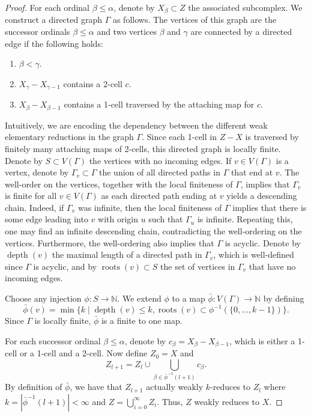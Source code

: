 \documentclass{amsart}
\theoremstyle{definition}
\DeclareMathOperator{\depth}{depth}
\DeclareMathOperator{\roots}{roots}
\newcommand{\N}{\mathbb{N}}
\begin{document}
\begin{proof}
    For each ordinal $\beta\leqslant \alpha$, denote by $X_{\beta}\subset Z$ the associated subcomplex. We construct a directed graph $\Gamma$ as follows. The vertices of this graph are the successor ordinals $\beta\leqslant \alpha$ and two vertices $\beta$ and $\gamma$ are connected by a directed edge if the following holds:
    \begin{enumerate}
        \item $\beta<\gamma$.
        \item $X_{\gamma} - X_{\gamma -1}$ contains a 2-cell $c$.
        \item $X_{\beta} - X_{\beta-1}$ contains a 1-cell traversed by the attaching map for $c$.
    \end{enumerate} 
Intuitively, we are encoding the dependency between the different weak elementary reductions in the graph $\Gamma$. Since each 1-cell in $Z - X$ is traversed by finitely many attaching maps of 2-cells, this directed graph is locally finite. Denote by $S\subset V(\Gamma)$ the vertices with no incoming edges. If $v\in V(\Gamma)$ is a vertex, denote by $\Gamma_v\subset \Gamma$ the union of all directed paths in $\Gamma$ that end at $v$. The well-order on the vertices, together with the local finiteness of $\Gamma$, implies that $\Gamma_v$ is finite for all $v\in V(\Gamma)$ as each directed path ending at $v$ yields a descending chain. Indeed, if $\Gamma_v$ was infinite, then the local finiteness of $\Gamma$ implies that there is some edge leading into $v$ with origin $u$ such that $\Gamma_u$ is infinite. Repeating this, one may find an infinite descending chain, contradicting the well-ordering on the vertices. Furthermore, the well-ordering also implies that $\Gamma$ is acyclic. Denote by $\depth(v)$ the maximal length of a directed path in $\Gamma_v$, which is well-defined since $\Gamma$ is acyclic, and by $\roots(v)\subset S$ the set of vertices in $\Gamma_v$ that have no incoming edges.

    Choose any injection $\phi\colon S\to \N$. We extend $\phi$ to a map $\bar{\phi}\colon V(\Gamma)\to \N$ by defining 
    \[
    \bar{\phi}(v) = \min{\{k \mid \depth(v)\leqslant k, \roots(v)\subset \phi^{-1}(\{0, \ldots, k-1\})\}}.
    \]
    Since $\Gamma$ is locally finite, $\bar{\phi}$ is a finite to one map.

    For each successor ordinal $\beta\leqslant \alpha$, denote by $c_{\beta} = X_{\beta} - X_{\beta-1}$, which is either a 1-cell or a 1-cell and a 2-cell. Now define $Z_0 = X$ and
    \[
    Z_{l+1} = Z_l \cup \bigcup_{\beta\in \bar{\phi}^{-1}(l+1)}c_{\beta}.
    \]
    By definition of $\bar{\phi}$, we have that $Z_{l+1}$ actually weakly $k$-reduces to $Z_{l}$ where $k = |\bar{\phi}^{-1}(l+1)|<\infty$ and $Z = \bigcup_{i=0}^{\infty}Z_i$. Thus, $Z$ weakly reduces to $X$.
\end{proof}
\end{document}
